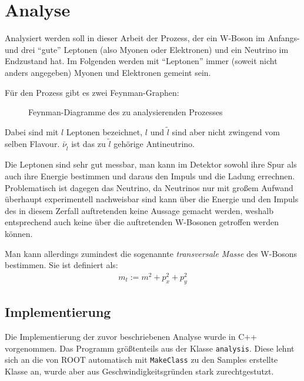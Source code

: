 \section{Analyse}
Analysiert werden soll in dieser Arbeit der Prozess, der ein W-Boson im Anfangs-
und drei "`gute"' Leptonen (also Myonen oder Elektronen) und ein Neutrino im
Endzustand hat. Im Folgenden werden mit "`Leptonen"' immer (soweit nicht anders
angegeben) Myonen und Elektronen gemeint sein.

Für den Prozess gibt es zwei Feynman-Graphen:

\begin{figure}[h!]
  \begin{minipage}{0.49\textwidth}
    \centering
    
  \end{minipage}
  \begin{minipage}{0.49\textwidth}
    \centering
    
  \end{minipage}
  \caption{Feynman-Diagramme des zu analysierenden Prozesses}
  \label{fig:feynman}
\end{figure}
Dabei sind mit $l$ Leptonen bezeichnet, $l$ und $\tilde l$ sind aber nicht
zwingend vom selben Flavour. $\bar \nu_{\tilde l}$ ist das zu $\tilde l$
gehörige Antineutrino.

Die Leptonen sind sehr gut messbar, man kann im Detektor sowohl ihre Spur als
auch ihre Energie bestimmen und daraus den Impuls und die Ladung errechnen.
Problematisch ist dagegen das Neutrino, da Neutrinos nur mit großem Aufwand
überhaupt experimentell nachweisbar sind\cite{needed} kann über die Energie und
den Impuls des in diesem Zerfall auftretenden keine Aussage gemacht werden,
weshalb entsprechend auch keine über die auftretenden W-Bosonen getroffen werden
können.

\label{cha:met}
Man kann allerdings zumindest die sogenannte \emph{transversale Masse} des
W-Bosons bestimmen. Sie ist definiert als:
\begin{align}
  m_t := m^2 + p_x^2 + p_y^2
  \label{}
\end{align}

\subsection{Implementierung}
Die Implementierung der zuvor beschriebenen Analyse wurde in C++ vorgenommen.
Das Programm größtenteils aus der Klasse \lstinline!analysis!. Diese lehnt sich
an die von ROOT automatisch mit \lstinline!MakeClass! zu den Samples erstellte
Klasse an, wurde aber aus Geschwindigkeitsgründen stark zurechtgestutzt.

